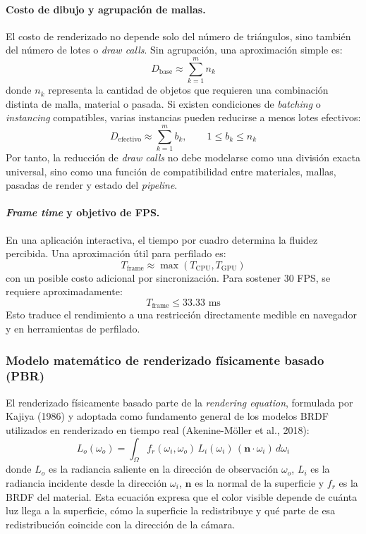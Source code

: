 \paragraph{Costo de dibujo y agrupaci\'on de mallas.}
El costo de renderizado no depende solo del n\'umero de tri\'angulos, sino tambi\'en del n\'umero de lotes o \textit{draw calls}. Sin agrupaci\'on, una aproximaci\'on simple es:
\[
D_{\text{base}} \approx \sum_{k=1}^{m} n_k
\]
donde $n_k$ representa la cantidad de objetos que requieren una combinaci\'on distinta de malla, material o pasada. Si existen condiciones de \textit{batching} o \textit{instancing} compatibles, varias instancias pueden reducirse a menos lotes efectivos:
\[
D_{\text{efectivo}} \approx \sum_{k=1}^{m} b_k, \qquad 1 \leq b_k \leq n_k
\]
Por tanto, la reducci\'on de \textit{draw calls} no debe modelarse como una divisi\'on exacta universal, sino como una funci\'on de compatibilidad entre materiales, mallas, pasadas de render y estado del \textit{pipeline}.

\paragraph{\textit{Frame time} y objetivo de FPS.}
En una aplicaci\'on interactiva, el tiempo por cuadro determina la fluidez percibida. Una aproximaci\'on \'util para perfilado es:
\[
T_{\text{frame}} \approx \max(T_{\text{CPU}}, T_{\text{GPU}})
\]
con un posible costo adicional por sincronizaci\'on. Para sostener 30 FPS, se requiere aproximadamente:
\[
T_{\text{frame}} \leq 33.33 \text{ ms}
\]
Esto traduce el rendimiento a una restricci\'on directamente medible en navegador y en herramientas de perfilado.

\subsubsection{Modelo matem\'atico de renderizado f\'isicamente basado (PBR)}

El renderizado f\'isicamente basado parte de la \textit{rendering equation}, formulada por Kajiya (1986) y adoptada como fundamento general de los modelos BRDF utilizados en renderizado en tiempo real (Akenine-M\"oller et al., 2018):
\[
L_o(\omega_o) = \int_{\Omega} f_r(\omega_i,\omega_o)\, L_i(\omega_i)\, (\mathbf{n}\cdot\omega_i)\, d\omega_i
\]
donde $L_o$ es la radiancia saliente en la direcci\'on de observaci\'on $\omega_o$, $L_i$ es la radiancia incidente desde la direcci\'on $\omega_i$, $\mathbf{n}$ es la normal de la superficie y $f_r$ es la BRDF del material. Esta ecuaci\'on expresa que el color visible depende de cu\'anta luz llega a la superficie, c\'omo la superficie la redistribuye y qu\'e parte de esa redistribuci\'on coincide con la direcci\'on de la c\'amara.

